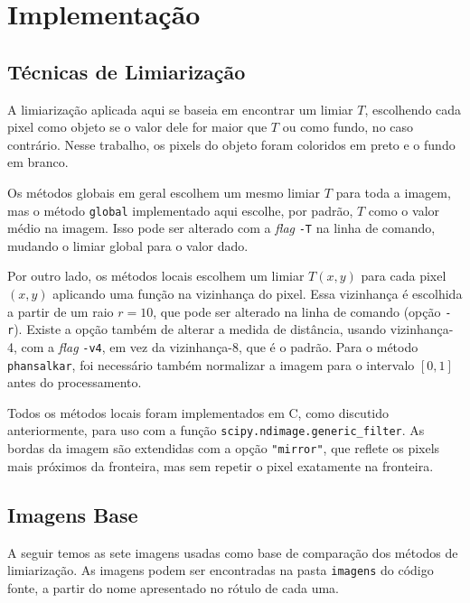 \section{Implementação} \label{sec:impl}

\subsection{Técnicas de Limiarização}

    A limiarização aplicada aqui se baseia em encontrar um limiar $T$, escolhendo cada pixel como objeto se o valor dele for maior que $T$ ou como fundo, no caso contrário. Nesse trabalho, os pixels do objeto foram coloridos em preto e o fundo em branco.

    Os métodos globais em geral escolhem um mesmo limiar $T$ para toda a imagem, mas o método \texttt{global} implementado aqui escolhe, por padrão, $T$ como o valor médio na imagem. Isso pode ser alterado com a \textit{flag} \texttt{-T} na linha de comando, mudando o limiar global para o valor dado.

    Por outro lado, os métodos locais escolhem um limiar $T(x, y)$ para cada pixel $(x, y)$ aplicando uma função na vizinhança do pixel. Essa vizinhança é escolhida a partir de um raio $r = 10$, que pode ser alterado na linha de comando (opção \texttt{-r}). Existe a opção também de alterar a medida de distância, usando vizinhança-4, com a \textit{flag} \texttt{-v4}, em vez da vizinhança-8, que é o padrão. Para o método \texttt{phansalkar}, foi necessário também normalizar a imagem para o intervalo $[0, 1]$ antes do processamento.

    Todos os métodos locais foram implementados em C, como discutido anteriormente, para uso com a função \texttt{scipy.ndimage.generic_filter}. As bordas da imagem são extendidas com a opção \texttt{"mirror"}, que reflete os pixels mais próximos da fronteira, mas sem repetir o pixel exatamente na fronteira.

\begingroup
\subsection{Imagens Base} \label{sec:imgbase}


A seguir temos as sete imagens usadas como base de comparação dos métodos de limiarização. As imagens podem ser encontradas na pasta \texttt{imagens} do código fonte, a partir do nome apresentado no rótulo de cada uma.

